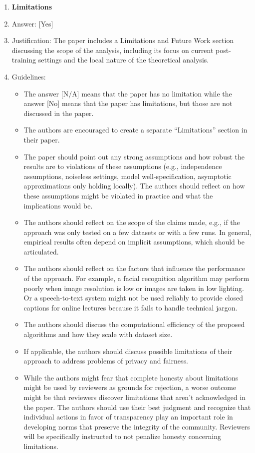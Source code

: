 \documentclass{llmxive}
\providecommand{\answerYes}[1][]{[Yes]#1}
\providecommand{\answerNo}[1][]{[No]#1}
\providecommand{\answerNA}[1][]{[N/A]#1}
\begin{document}
\begin{enumerate}
\item {\bf Limitations}
    \item[] Answer: \answerYes{}
    \item[] Justification: The paper includes a Limitations and Future Work section discussing the scope of the analysis, including its focus on current post-training settings and the local nature of the theoretical analysis.
    \item[] Guidelines:
    \begin{itemize}
        \item The answer \answerNA{} means that the paper has no limitation while the answer \answerNo{} means that the paper has limitations, but those are not discussed in the paper. 
        \item The authors are encouraged to create a separate ``Limitations'' section in their paper.
        \item The paper should point out any strong assumptions and how robust the results are to violations of these assumptions (e.g., independence assumptions, noiseless settings, model well-specification, asymptotic approximations only holding locally). The authors should reflect on how these assumptions might be violated in practice and what the implications would be.
        \item The authors should reflect on the scope of the claims made, e.g., if the approach was only tested on a few datasets or with a few runs. In general, empirical results often depend on implicit assumptions, which should be articulated.
        \item The authors should reflect on the factors that influence the performance of the approach. For example, a facial recognition algorithm may perform poorly when image resolution is low or images are taken in low lighting. Or a speech-to-text system might not be used reliably to provide closed captions for online lectures because it fails to handle technical jargon.
        \item The authors should discuss the computational efficiency of the proposed algorithms and how they scale with dataset size.
        \item If applicable, the authors should discuss possible limitations of their approach to address problems of privacy and fairness.
        \item While the authors might fear that complete honesty about limitations might be used by reviewers as grounds for rejection, a worse outcome might be that reviewers discover limitations that aren't acknowledged in the paper. The authors should use their best judgment and recognize that individual actions in favor of transparency play an important role in developing norms that preserve the integrity of the community. Reviewers will be specifically instructed to not penalize honesty concerning limitations.
    \end{itemize}


\end{enumerate}
\end{document}
